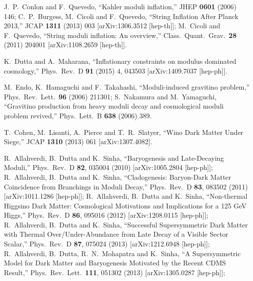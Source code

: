 \documentclass[11pt,a4paper]{article}
\begin{document}
\begin{thebibliography}{99}
  J.~P.~Conlon and F.~Quevedo,
  ``Kahler moduli inflation,''
  JHEP {\bf 0601} (2006) 146;
 C.~P.~Burgess, M.~Cicoli and F.~Quevedo,
  ``String Inflation After Planck 2013,''
  JCAP {\bf 1311} (2013) 003
  [arXiv:1306.3512 [hep-th]];
  M.~Cicoli and F.~Quevedo,
  ``String moduli inflation: An overview,''
  Class.\ Quant.\ Grav.\  {\bf 28} (2011) 204001
  [arXiv:1108.2659 [hep-th]].

  K.~Dutta and A.~Maharana,
  ``Inflationary constraints on modulus dominated cosmology,''
  Phys.\ Rev.\ D {\bf 91} (2015) 4,  043503
  [arXiv:1409.7037 [hep-ph]].
  
M.~Endo, K.~Hamaguchi and F.~Takahashi,
  ``Moduli-induced gravitino problem,''
  Phys.\ Rev.\ Lett.\  {\bf 96} (2006) 211301;
S.~Nakamura and M.~Yamaguchi,
  ``Gravitino production from heavy moduli decay and cosmological moduli problem revived,''
  Phys.\ Lett.\ B {\bf 638} (2006) 389.

  T.~Cohen, M.~Lisanti, A.~Pierce and T.~R.~Slatyer,
  ``Wino Dark Matter Under Siege,''
  JCAP {\bf 1310} (2013) 061
  [arXiv:1307.4082].

  R.~Allahverdi, B.~Dutta and K.~Sinha,
  ``Baryogenesis and Late-Decaying Moduli,''
  Phys.\ Rev.\ D {\bf 82}, 035004 (2010)
  [arXiv:1005.2804 [hep-ph]];
  R.~Allahverdi, B.~Dutta and K.~Sinha,
  ``Cladogenesis: Baryon-Dark Matter Coincidence from Branchings in Moduli Decay,''
  Phys.\ Rev.\ D {\bf 83}, 083502 (2011)
  [arXiv:1011.1286 [hep-ph]];
  R.~Allahverdi, B.~Dutta and K.~Sinha,
  ``Non-thermal Higgsino Dark Matter: Cosmological Motivations and Implications for a 125 GeV Higgs,''
  Phys.\ Rev.\ D {\bf 86}, 095016 (2012)
  [arXiv:1208.0115 [hep-ph]];
  R.~Allahverdi, B.~Dutta and K.~Sinha,
  ``Successful Supersymmetric Dark Matter with Thermal Over/Under-Abundance from Late Decay of a Visible Sector Scalar,''
  Phys.\ Rev.\ D {\bf 87}, 075024 (2013)
  [arXiv:1212.6948 [hep-ph]];
  R.~Allahverdi, B.~Dutta, R.~N.~Mohapatra and K.~Sinha,
  ``A Supersymmetric Model for Dark Matter and Baryogenesis Motivated by the Recent CDMS Result,''
  Phys.\ Rev.\ Lett.\  {\bf 111}, 051302 (2013)
  [arXiv:1305.0287 [hep-ph]];


\end{thebibliography}
\end{document}

